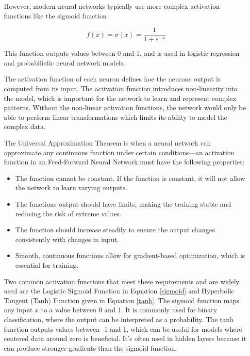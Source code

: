 However, modern neural networks typically use more complex activation functions like the sigmoid function

\begin{equation}
    f(x) = \sigma(x) = \frac{1}{1 + e^{-x}}
\end{equation}

This function outputs values between 0 and 1, and is used in logistic regression and probabilistic neural network models.




The activation function of each neuron defines hoe the neurons output is computed from its input. The activation function introduces non-linearity into the model, which is important for the network to learn and represent complex patterns. Without the non-linear activation functions, the network would only be able to perform linear transformations which limits its ability to model the complex data.  


The Universal Approximation Theorem is when a neural network can approximate any continuous function under certain conditions—an activation function in an Feed-Forward Neural Network must have the following properties:

\begin{itemize}
    \item  The function cannot be constant. If the function is constant, it will not allow the network to learn varying outputs. 
    \item The functions output should have limits, making the training stable and reducing the risk of extreme values. 
    \item The function should increase steadily to ensure the output changes consistently with changes in input. 
    \item Smooth, continuous functions allow for gradient-based optimization, which is essential for training. 
\end{itemize}





Two common activation functions that meet these requirements and are widely used are the Logistic Sigmoid Function in Equation \ref{sigmoid} and Hyperbolic Tangent (Tanh) Function given in Equation \ref{tanh}. The sigmoid function maps any input \( x \) to a value between 0 and 1. It is commonly used for binary classification, where the output can be interpreted as a probability.
The tanh function outputs values between -1 and 1, which can be useful for models where centered data around zero is beneficial. It’s often used in hidden layers because it can produce stronger gradients than the sigmoid function.


